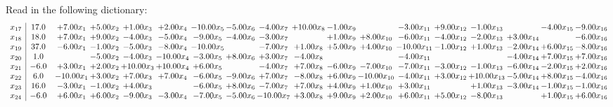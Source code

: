 \documentclass[9pt]{article}
\begin{document}
Read in the following dictionary:
\[\begin{array}{c| c c@{\hskip 2pt} c@{\hskip 2pt} c@{\hskip 2pt} c@{\hskip 2pt} c@{\hskip 2pt} c@{\hskip 2pt} c@{\hskip 2pt} c@{\hskip 2pt} c@{\hskip 2pt} c@{\hskip 2pt} c@{\hskip 2pt} c@{\hskip 2pt} c@{\hskip 2pt} c@{\hskip 2pt} c@{\hskip 2pt} c@{\hskip 2pt} }
 x_{17}   &  17.0 & +  7.00 x_{1} & +  5.00 x_{2} & +  1.00 x_{3} & +  2.00 x_{4} & -10.00 x_{5} & -5.00 x_{6} & -4.00 x_{7} & + 10.00 x_{8} & -1.00 x_{9} &   & -3.00 x_{11} & +  9.00 x_{12} & -1.00 x_{13} &   & -4.00 x_{15} & -9.00 x_{16}\\
 x_{18}   &  18.0 & +  7.00 x_{1} & +  9.00 x_{2} & -4.00 x_{3} & -5.00 x_{4} & -9.00 x_{5} & -4.00 x_{6} & -3.00 x_{7} &   & +  1.00 x_{9} & +  8.00 x_{10} & -6.00 x_{11} & -4.00 x_{12} & -2.00 x_{13} & +  3.00 x_{14} &   & -6.00 x_{16}\\
 x_{19}   &  37.0 & -6.00 x_{1} & -1.00 x_{2} & -5.00 x_{3} & -8.00 x_{4} & -10.00 x_{5} &   & -7.00 x_{7} & +  1.00 x_{8} & +  5.00 x_{9} & +  4.00 x_{10} & -10.00 x_{11} & -1.00 x_{12} & +  1.00 x_{13} & -2.00 x_{14} & +  6.00 x_{15} & -8.00 x_{16}\\
 x_{20}   &  1.0  &   & -5.00 x_{2} & -4.00 x_{3} & -10.00 x_{4} & -3.00 x_{5} & +  8.00 x_{6} & +  3.00 x_{7} & -4.00 x_{8} &    &   & -4.00 x_{11} &    &   & -4.00 x_{14} & +  7.00 x_{15} & +  7.00 x_{16}\\
 x_{21}   &  -6.0 & +  3.00 x_{1} & +  2.00 x_{2} & + 10.00 x_{3} & + 10.00 x_{4} & +  6.00 x_{5} &   & -4.00 x_{7} & +  7.00 x_{8} & -6.00 x_{9} & -7.00 x_{10} & -7.00 x_{11} & -3.00 x_{12} & -1.00 x_{13} & -6.00 x_{14} & -2.00 x_{15} & +  2.00 x_{16}\\
 x_{22}   &  6.0 & -10.00 x_{1} & +  3.00 x_{2} & +  7.00 x_{3} & +  7.00 x_{4} & -6.00 x_{5} & -9.00 x_{6} & +  7.00 x_{7} & -8.00 x_{8} & +  6.00 x_{9} & -10.00 x_{10} & -4.00 x_{11} & +  3.00 x_{12} & + 10.00 x_{13} & -5.00 x_{14} & +  8.00 x_{15} & -4.00 x_{16}\\
 x_{23}   &  16.0 & -3.00 x_{1} & -1.00 x_{2} & +  4.00 x_{3} &   & -6.00 x_{5} & +  8.00 x_{6} & -7.00 x_{7} & +  7.00 x_{8} & +  4.00 x_{9} & +  1.00 x_{10} & +  3.00 x_{11} &   & +  1.00 x_{13} & -3.00 x_{14} & -1.00 x_{15} & -1.00 x_{16}\\
 x_{24}   &  -6.0 & +  6.00 x_{1} & +  6.00 x_{2} & -9.00 x_{3} & -3.00 x_{4} & -7.00 x_{5} & -5.00 x_{6} & -10.00 x_{7} & +  3.00 x_{8} & +  9.00 x_{9} & +  2.00 x_{10} & +  6.00 x_{11} & +  5.00 x_{12} & -8.00 x_{13} &   & +  1.00 x_{15} & +  6.00 x_{16}\\

\end{array}\]
\end{document}
